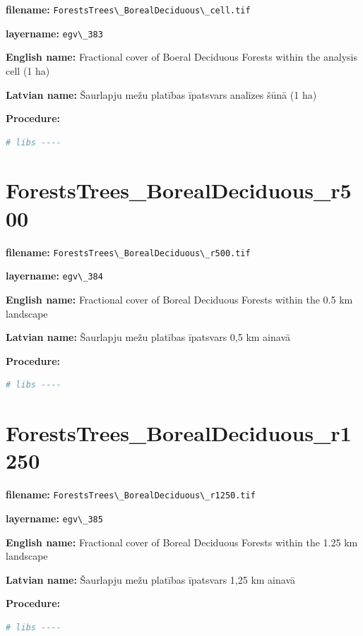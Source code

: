 \documentclass[
]{book}
\newcommand{\passthrough}[1]{#1}
\begin{document}
\textbf{filename:} \passthrough{\lstinline!ForestsTrees\_BorealDeciduous\_cell.tif!}

\textbf{layername:} \passthrough{\lstinline!egv\_383!}

\textbf{English name:} Fractional cover of Boeral Deciduous Forests within the analysis cell (1 ha)

\textbf{Latvian name:} Šaurlapju mežu platības īpatsvars analīzes šūnā (1 ha)

\textbf{Procedure:}

\begin{lstlisting}[language=R]
# libs ----
\end{lstlisting}

\section{ForestsTrees\_BorealDeciduous\_r500}\label{ch06.384}

\textbf{filename:} \passthrough{\lstinline!ForestsTrees\_BorealDeciduous\_r500.tif!}

\textbf{layername:} \passthrough{\lstinline!egv\_384!}

\textbf{English name:} Fractional cover of Boreal Deciduous Forests within the 0.5 km landscape

\textbf{Latvian name:} Šaurlapju mežu platības īpatsvars 0,5 km ainavā

\textbf{Procedure:}

\begin{lstlisting}[language=R]
# libs ----
\end{lstlisting}

\section{ForestsTrees\_BorealDeciduous\_r1250}\label{ch06.385}

\textbf{filename:} \passthrough{\lstinline!ForestsTrees\_BorealDeciduous\_r1250.tif!}

\textbf{layername:} \passthrough{\lstinline!egv\_385!}

\textbf{English name:} Fractional cover of Boreal Deciduous Forests within the 1.25 km landscape

\textbf{Latvian name:} Šaurlapju mežu platības īpatsvars 1,25 km ainavā

\textbf{Procedure:}

\begin{lstlisting}[language=R]
# libs ----
\end{lstlisting}
\end{document}
